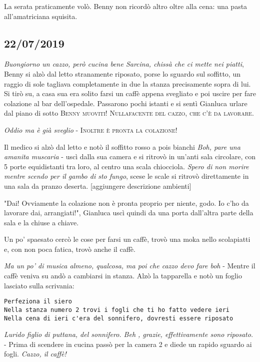 La serata praticamente volò. Benny non ricordò altro oltre alla cena: una pasta all'amatriciana squisita.

\subsection*{22/07/2019}

\textit{Buongiorno un cazzo, però cucina bene Sarcina, chissà che ci mette nei piatti}, Benny si alzò dal letto stranamente riposato, porse lo sguardo sul soffitto, un raggio di sole tagliava completamente in due la stanza precisamente sopra di lui. Si tirò su, a casa sua era solito farsi un caffè appena svegliato e poi uscire per fare colazione al bar dell'ospedale. Passarono pochi istanti e si sentì Gianluca urlare dal piano di sotto \textsc{Benny muoviti! Nullafacente del cazzo, che c'è da lavorare.}

\textit{Oddio ma è già sveglio}  - \textsc{Inoltre è pronta la colazione!}

Il medico si alzò dal letto e notò il soffitto rosso a pois bianchi \textit{Boh, pare una amanita muscaria} - uscì dalla sua camera e si ritrovò in un'anti sala circolare, con 5 porte equidistanti tra loro, al centro una scala chiocciola. \textit{Spero di non morire mentre scendo per il gambo di sto fungo}, scese le scale si ritrovò direttamente in una sala da pranzo deserta.
[aggiungere descrizione ambienti]

"Dai! Ovviamente la colazione non è pronta proprio per niente, godo. Io c'ho da lavorare dai, arrangiati!", Gianluca uscì quindi da una porta dall'altra parte della sala e la chiuse a chiave.

Un po' spaesato cercò le cose per farsi un caffè, trovò una moka nello scolapiatti e, con non poca fatica, trovò anche il caffè.

\textit{Ma un po' di musica almeno, qualcosa, ma poi che cazzo devo fare boh} - Mentre il caffè veniva su andò a cambiarsi in stanza. Alzò la tapparella e notò un foglio lasciato sulla scrivania:
\begin{lstlisting}
Perfeziona il siero
Nella stanza numero 2 trovi i fogli che ti ho fatto vedere ieri
Nella cena di ieri c'era del sonnifero, dovresti essere riposato
\end{lstlisting}

\textit{Lurido figlio di puttana, del sonnifero. Beh , grazie, effettivamente sono riposato.} - Prima di scendere in cucina passò per la camera 2 e diede un rapido sguardo ai fogli. \textit{Cazzo, il caffè!}

